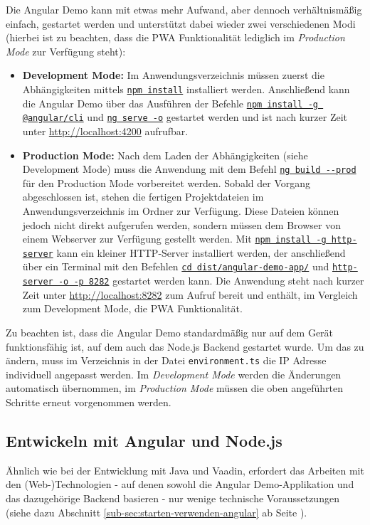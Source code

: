 \documentclass[a4paper,12pt,twoside]{scrreprt}
\begin{document}
Die Angular Demo kann mit etwas mehr Aufwand, aber dennoch verhältnismäßig einfach, gestartet werden und unterstützt dabei wieder zwei verschiedenen Modi (hierbei ist zu beachten, dass die \ac{PWA} Funktionalität lediglich im \textit{Production Mode} zur Verfügung steht):

\begin{itemize}
    \item \textbf{Development Mode:} Im Anwendungsverzeichnis  müssen zuerst die Abhängigkeiten mittels \underline{\texttt{npm install}} installiert werden. Anschließend kann die Angular Demo über das Ausführen der Befehle \underline{\texttt{npm install -g @angular/cli}} und \underline{\texttt{ng serve -o}} gestartet werden und ist nach kurzer Zeit unter \url{http://localhost:4200} aufrufbar.
    \item \textbf{Production Mode:} Nach dem Laden der Abhängigkeiten (siehe Development Mode) muss die Anwendung mit dem Befehl \underline{\texttt{ng build -{}-prod}} für den Production Mode vorbereitet werden. Sobald der Vorgang abgeschlossen ist, stehen die fertigen Projektdateien im Anwendungsverzeichnis im Ordner  zur Verfügung. \newline
    Diese Dateien können jedoch nicht direkt aufgerufen werden, sondern müssen dem Browser von einem Webserver zur Verfügung gestellt werden. Mit \underline{\texttt{npm install -g http-server}} kann ein kleiner HTTP-Server installiert werden, der anschließend über ein Terminal mit den Befehlen \underline{\texttt{cd dist/angular-demo-app/}} und \underline{\texttt{http-server -o -p 8282}} gestartet werden kann. Die Anwendung steht nach kurzer Zeit unter \url{http://localhost:8282} zum Aufruf bereit und enthält, im Vergleich zum Development Mode, die \ac{PWA} Funktionalität.
\end{itemize}

Zu beachten ist, dass die Angular Demo standardmäßig nur auf dem Gerät funktionsfähig ist, auf dem auch das Node.js Backend gestartet wurde. Um das zu ändern, muss im Verzeichnis  in der Datei \texttt{environment.ts} die IP Adresse individuell angepasst werden. Im \textit{Development Mode} werden die Änderungen automatisch übernommen, im \textit{Production Mode} müssen die oben angeführten Schritte erneut vorgenommen werden.

\subsection{Entwickeln mit Angular und Node.js}
\label{sub-sec:entwickeln-angular}
Ähnlich wie bei der Entwicklung mit Java und Vaadin, erfordert das Arbeiten mit den (Web-)Technologien - auf denen sowohl die Angular Demo-Applikation und das dazugehörige Backend basieren - nur wenige technische Voraussetzungen (siehe dazu Abschnitt \ref{sub-sec:starten-verwenden-angular} ab Seite \pageref{sub-sec:starten-verwenden-angular}).
\end{document}
